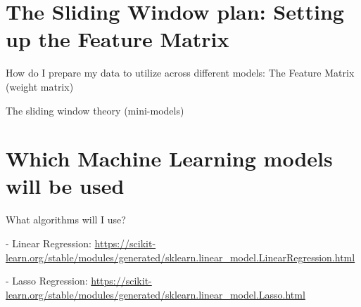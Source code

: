 \documentclass[12pt]{report} %
\begin{document}
\section{The Sliding Window plan: Setting up the Feature Matrix}

How do I prepare my data to utilize across different models: The Feature Matrix (weight matrix)

The sliding window theory (mini-models)

\section{Which Machine Learning models will be used}
What algorithms will I use?

- Linear Regression: \url{https://scikit-learn.org/stable/modules/generated/sklearn.linear_model.LinearRegression.html}



- Lasso Regression: \url{https://scikit-learn.org/stable/modules/generated/sklearn.linear_model.Lasso.html}








\end{document}
